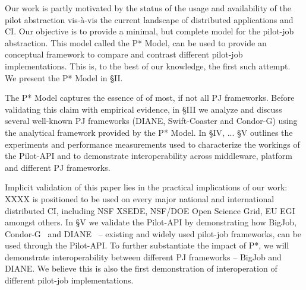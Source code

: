 \documentclass[conference,final]{IEEEtran}
\begin{document}

Our work is partly motivated by the status of the usage and
availability of the pilot abstraction vis-\`{a}-vis the current
landscape of distributed applications and CI. Our objective is to
provide a minimal, but complete model for the pilot-job abstraction.
This model called the P* Model, can be used to provide an conceptual
framework to compare and contrast different pilot-job
implementations. This is, to the best of our knowledge, the first such
attempt. We present the P* Model in \S{II}.



The P* Model captures the essence of of most, if not all PJ
frameworks.  Before validating this claim with empirical evidence, in
\S{III} we analyze and discuss several well-known PJ frameworks (DIANE,
Swift-Coaster and Condor-G) using the analytical framework provided by
the P* Model.  %
In \S{IV}, ...  \S{V} outlines the experiments and performance
measurements used to characterize the workings of the Pilot-API and to
demonstrate interoperability across middleware, platform and different
PJ frameworks.


Implicit validation of this paper lies in the practical implications
of our work: XXXX is positioned to be used on every major national and
international distributed CI, including NSF XSEDE, NSF/DOE Open
Science Grid, EU EGI amongst others. In \S{V} we validate the
Pilot-API by demonstrating how BigJob, Condor-G~\cite{condor-g} and
DIANE~\cite{Moscicki:908910} -- existing and widely used pilot-job
frameworks, can be used through the Pilot-API.
To further substantiate the impact of P*, we will demonstrate 
interoperability between different PJ frameworks -- BigJob and DIANE. We
believe this is also the first demonstration of interoperation of
different pilot-job implementations.
\end{document}

